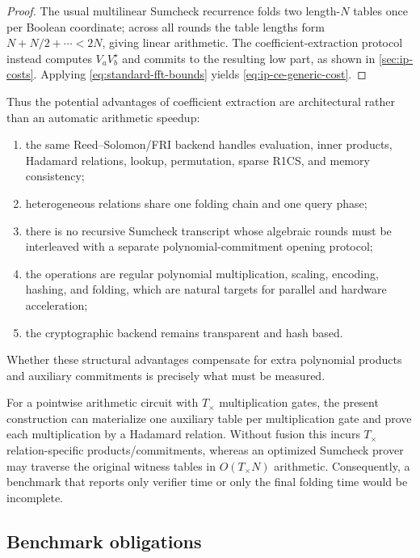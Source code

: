 \begin{proof}
The usual multilinear Sumcheck recurrence folds two length-$N$ tables once per Boolean coordinate; across all rounds the table lengths form $N+N/2+\cdots<2N$, giving linear arithmetic.  The coefficient-extraction protocol instead computes $V_aV_b^\star$ and commits to the resulting low part, as shown in \cref{sec:ip-costs}.  Applying \eqref{eq:standard-fft-bounds} yields \eqref{eq:ip-ce-generic-cost}.
\end{proof}

Thus the potential advantages of coefficient extraction are architectural rather than an automatic arithmetic speedup:
\begin{enumerate}[label=(\roman*),leftmargin=*]
  \item the same Reed--Solomon/FRI backend handles evaluation, inner products, Hadamard relations, lookup, permutation, sparse R1CS, and memory consistency;
  \item heterogeneous relations share one folding chain and one query phase;
  \item there is no recursive Sumcheck transcript whose algebraic rounds must be interleaved with a separate polynomial-commitment opening protocol;
  \item the operations are regular polynomial multiplication, scaling, encoding, hashing, and folding, which are natural targets for parallel and hardware acceleration;
  \item the cryptographic backend remains transparent and hash based.
\end{enumerate}
Whether these structural advantages compensate for extra polynomial products and auxiliary commitments is precisely what must be measured.

For a pointwise arithmetic circuit with $T_\times$ multiplication gates, the present construction can materialize one auxiliary table per multiplication gate and prove each multiplication by a Hadamard relation.  Without fusion this incurs $T_\times$ relation-specific products/commitments, whereas an optimized Sumcheck prover may traverse the original witness tables in $O(T_\times N)$ arithmetic.  Consequently, a benchmark that reports only verifier time or only the final folding time would be incomplete.

\subsection{Benchmark obligations}
\label{sec:complexity-benchmark-plan}

